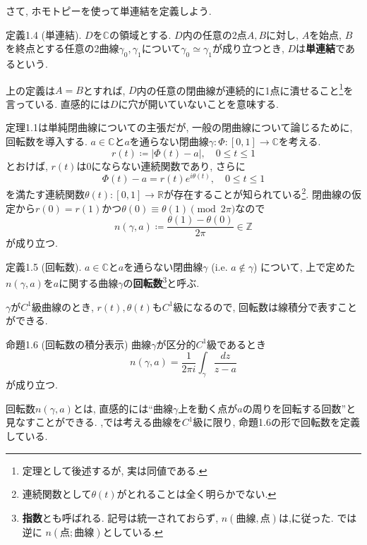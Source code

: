 \documentclass{jsarticle}
\newcommand{\Z}{\mathbb{Z}}%
\newcommand{\R}{\mathbb{R}}%
\newcommand{\C}{\mathbb{C}}%
\begin{document}
さて, ホモトピーを使って単連結を定義しよう.

\begin{Def}{定義1.4 (単連結).}
$D$を$\C$の領域とする. $D$内の任意の2点$A, B$に対し, $A$を始点, $B$を終点とする任意の2曲線$\gamma_0, \gamma_1$について$\gamma_0\simeq\gamma_1$が成り立つとき, $D$は\textbf{単連結}であるという.
\end{Def}

上の定義は$A=B$とすれば, $D$内の任意の閉曲線が連続的に1点に潰せること\footnote{定理として後述するが, 実は同値である.}を言っている. 直感的には$D$に穴が開いていないことを意味する.

\vspace{1em}

定理1.1は単純閉曲線についての主張だが, 一般の閉曲線について論じるために, 回転数を導入する. $a\in\C$と$a$を通らない閉曲線$\gamma\colon\Phi\colon[0, 1]\to\C$を考える. 
\[
r(t)\coloneq|\Phi(t)-a|,\hspace{1em}0\le t\le 1
\]
とおけば, $r(t)$は$0$にならない連続関数であり, さらに
\[
\Phi(t) - a = r(t)e^{i\theta(t)},\hspace{1em}0\le t\le 1
\]
を満たす連続関数$\theta(t)\colon[0,1]\to\R$が存在することが知られている\footnote{連続関数として$\theta(t)$がとれることは全く明らかでない.}. 閉曲線の仮定から$r(0)=r(1)$かつ$\theta(0)\equiv\theta(1)\pmod {2\pi}$なので
\[
n(\gamma, a)\coloneq\dfrac{\theta(1)-\theta(0)}{2\pi}\in\Z
\]
が成り立つ.

\begin{Def}{定義1.5 (回転数).}
$a\in\C$と$a$を通らない閉曲線$\gamma$ (i.e. $a\notin\gamma$) について, 上で定めた$n(\gamma, a)$を$a$に関する曲線$\gamma$の\textbf{回転数}\footnote{\textbf{指数}とも呼ばれる. 記号は統一されておらず, $n(\text{曲線}, \text{点})$は\cite{Ahlfors},\cite{Karel2}に従った. \cite{Noguchi}では逆に $n(\text{点}; \text{曲線})$としている.}と呼ぶ.
\end{Def}
$\gamma$が$C^1$級曲線のとき, $r(t), \theta(t)$も$C^1$級になるので, 回転数は線積分で表すことができる.

\begin{thm}{命題1.6 (回転数の積分表示)}
曲線$\gamma$が区分的$C^1$級であるとき
\[
n(\gamma, a) = \dfrac{1}{2\pi i}\int_{\gamma} \dfrac{dz}{z-a}
\]
が成り立つ.
\end{thm}

回転数$n(\gamma, a)$とは, 直感的には``曲線$\gamma$上を動く点が$a$の周りを回転する回数''と見なすことができる. \cite{Ahlfors},\cite{Noguchi}では考える曲線を$C^1$級に限り, 命題1.6の形で回転数を定義している.
\end{document}
